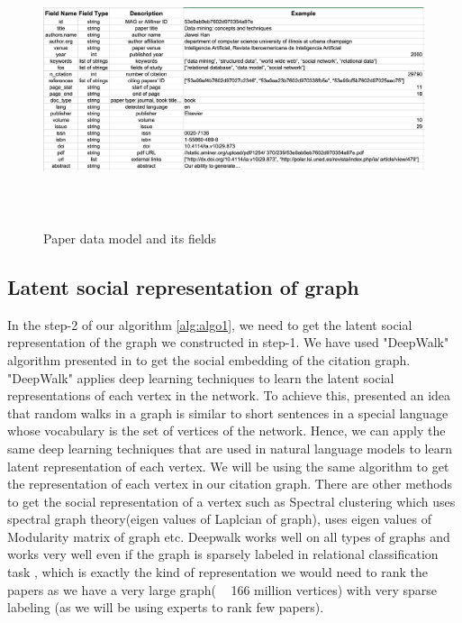 \documentclass[a4paper, 11pt]{article}
\begin{document}
\begin{figure}[h]
    \centering
    \includegraphics[width=17cm,height=8cm]{datamodel_new}
    \caption{Paper data model and its fields \cite{data}}
    \label{fig:datamodel}
\end{figure}


\subsection{Latent social representation of graph}
In the step-2 of our algorithm \ref{alg:algo1}, we need to get the latent social representation of the graph we constructed in step-1. We have used "DeepWalk" algorithm presented in \cite{deepwalk} to get the social embedding of the citation graph. "DeepWalk" applies deep learning techniques to learn the latent social representations of each vertex in the network. To achieve this,  \cite{deepwalk} presented an idea that random walks in a graph is similar to short sentences in a special language whose vocabulary is the set of vertices of the network. Hence, we can apply the same deep learning techniques that are used in natural language models to learn latent representation of each vertex. We will be using the same algorithm to get the representation of each vertex in our citation graph. There are other methods to get the social representation of a vertex such as Spectral clustering\cite{tang2011leveraging} which uses spectral graph theory(eigen values of Laplcian of graph), \cite{tang2009relational} uses eigen values of Modularity matrix of graph etc. Deepwalk works well on all types of  graphs and works very well even if the graph is sparsely labeled in relational classification task \cite{deepwalk}, which is exactly the kind of representation we would need to rank the papers as we have a very large graph( ~ 166 million vertices) with very sparse labeling (as we will be using experts to rank few papers). 
\end{document}
